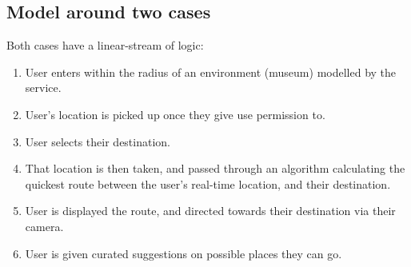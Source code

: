\subsection*{Model around two cases}
Both cases have a linear-stream of logic:

\begin{enumerate}
    \item User enters within the radius of an environment (museum) modelled by the service.
    \item User’s location is picked up once they give use permission to.
    \item User selects their destination.
    \item That location is then taken, and passed through an algorithm calculating the quickest route between the user’s real-time location, and their destination.
    \item User is displayed the route, and directed towards their destination via their camera.
    \item User is given curated suggestions on possible places they can go.
\end{enumerate}